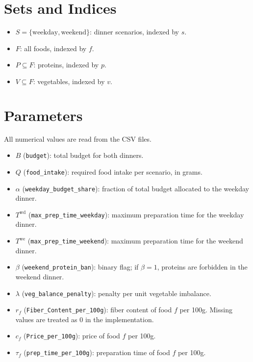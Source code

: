 \section*{Sets and Indices}

\begin{itemize}
    \item \(S=\{\text{weekday},\text{weekend}\}\): dinner scenarios, indexed by \(s\).
    \item \(F\): all foods, indexed by \(f\).
    \item \(P \subseteq F\): proteins, indexed by \(p\).
    \item \(V \subseteq F\): vegetables, indexed by \(v\).
\end{itemize}

\section*{Parameters}

All numerical values are read from the CSV files.

\begin{itemize}
    \item \(B\) (\texttt{budget}): total budget for both dinners.
    \item \(Q\) (\texttt{food\_intake}): required food intake per scenario, in grams.
    \item \(\alpha\) (\texttt{weekday\_budget\_share}): fraction of total budget allocated to the weekday dinner.
    \item \(T^{\text{wd}}\) (\texttt{max\_prep\_time\_weekday}): maximum preparation time for the weekday dinner.
    \item \(T^{\text{we}}\) (\texttt{max\_prep\_time\_weekend}): maximum preparation time for the weekend dinner.
    \item \(\beta\) (\texttt{weekend\_protein\_ban}): binary flag; if \(\beta=1\), proteins are forbidden in the weekend dinner.
    \item \(\lambda\) (\texttt{veg\_balance\_penalty}): penalty per unit vegetable imbalance.
    \item \(r_f\) (\texttt{Fiber\_Content\_per\_100g}): fiber content of food \(f\) per 100g. Missing values are treated as \(0\) in the implementation.
    \item \(c_f\) (\texttt{Price\_per\_100g}): price of food \(f\) per 100g.
    \item \(\tau_f\) (\texttt{prep\_time\_per\_100g}): preparation time of food \(f\) per 100g.
\end{itemize}


